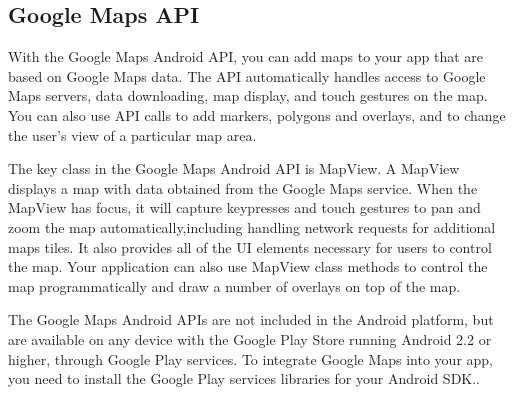 


\subsection{Google Maps API}
With the Google Maps Android API, you can add maps to your app that are based on Google Maps data. The API automatically handles access to Google Maps servers, data downloading, map display, and touch gestures on the map. You can also use API calls to add markers, polygons and overlays, and to change the user's view of a particular map area.

The key class in the Google Maps Android API is MapView. A MapView displays a map with data obtained from the Google Maps service. When the MapView has focus, it will capture keypresses and touch gestures to pan and zoom the map automatically,including handling network requests for additional maps tiles. It also provides all of the UI elements necessary for users to control the map. Your application can also use MapView class methods to control the map programmatically and draw a number of overlays on top of the map.

The Google Maps Android APIs are not included in the Android platform, but are available on any device with the Google Play Store running Android 2.2 or higher, through Google Play services.
To integrate Google Maps into your app, you need to install the Google Play services libraries for your Android SDK..








